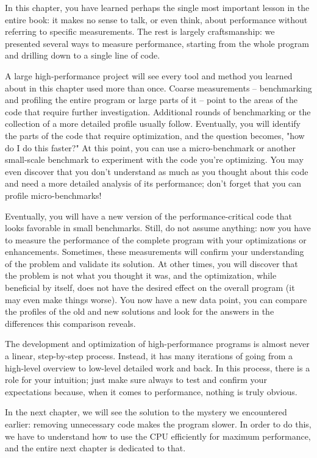 In this chapter, you have learned perhaps the single most important lesson in the entire book: it makes no sense to talk, or even think, about performance without referring to specific measurements. The rest is largely craftsmanship: we presented several ways to measure performance, starting from the whole program and drilling down to a single line of code.

A large high-performance project will see every tool and method you learned about in this chapter used more than once. Coarse measurements – benchmarking and profiling the entire program or large parts of it – point to the areas of the code that require further investigation. Additional rounds of benchmarking or the collection of a more detailed profile usually follow. Eventually, you will identify the parts of the code that require optimization, and the question becomes, "how do I do this faster?" At this point, you can use a micro-benchmark or another small-scale benchmark to experiment with the code you're optimizing. You may even discover that you don't understand as much as you thought about this code and need a more detailed analysis of its performance; don't forget that you can profile micro-benchmarks!

Eventually, you will have a new version of the performance-critical code that looks favorable in small benchmarks. Still, do not assume anything: now you have to measure the performance of the complete program with your optimizations or enhancements. Sometimes, these measurements will confirm your understanding of the problem and validate its solution. At other times, you will discover that the problem is not what you thought it was, and the optimization, while beneficial by itself, does not have the desired effect on the overall program (it may even make things worse). You now have a new data point, you can compare the profiles of the old and new solutions and look for the answers in the differences this comparison reveals. 

The development and optimization of high-performance programs is almost never a linear, step-by-step process. Instead, it has many iterations of going from a high-level overview to low-level detailed work and back. In this process, there is a role for your intuition; just make sure always to test and confirm your expectations because, when it comes to performance, nothing is truly obvious.

In the next chapter, we will see the solution to the mystery we encountered earlier: removing unnecessary code makes the program slower. In order to do this, we have to understand how to use the CPU efficiently for maximum performance, and the entire next chapter is dedicated to that.